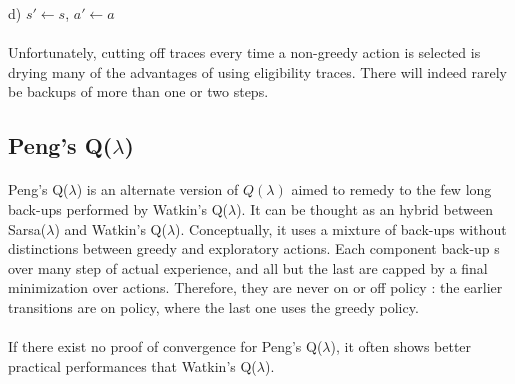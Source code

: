 \documentclass[a4paper]{article}
\newcommand\srsl{Sarsa($\lambda$)}
\newcommand\wtkl{Watkin's Q($\lambda$)}
\newcommand\pql{Peng's Q($\lambda$)}
\begin{document}
{{{\begin{algorithm}[H]
							\Indm \Indm 
							d) $s'\leftarrow s$, $a'\leftarrow a$
				\end{algorithm}
				}
				
			\paragraph{} Unfortunately, cutting off traces every time a non-greedy action is selected is drying many of the advantages of using eligibility traces. There will indeed rarely be backups of more than one or two steps. 
		}
		\subsection{\pql}
		{
			\paragraph{} \pql{} is an alternate version of $Q(\lambda)$ aimed to remedy to the few long back-ups performed by \wtkl. It can be thought as an hybrid between \srsl{} and \wtkl. Conceptually, it uses a mixture of back-ups without distinctions between greedy and exploratory actions. Each component back-up s over many step of actual experience, and all but the last are capped by a final minimization over actions. Therefore, they are never on or off policy : the earlier transitions are on policy, where the last one uses the greedy policy. 
			
			\paragraph{} If there exist no proof of convergence for \pql, it often shows better practical performances that \wtkl.  
		}
	}
\end{document}
